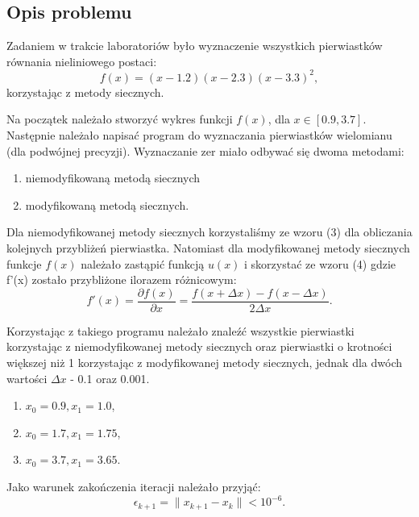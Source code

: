 \documentclass{article}
\begin{document}
\subsection{Opis problemu}
Zadaniem w trakcie laboratoriów było wyznaczenie wszystkich pierwiastków równania nieliniowego postaci:
\begin{equation}
	f(x) = (x - 1.2)(x - 2.3)(x - 3.3)^2 ,
\end{equation}
korzystając z metody siecznych. 
\par Na początek należało stworzyć wykres funkcji $f(x)$, dla $x \in [0.9, 3.7]$. Następnie należało napisać program do wyznaczania pierwiastków wielomianu (dla podwójnej precyzji). Wyznaczanie zer miało odbywać się dwoma metodami:
\begin{enumerate}
\begin{enumerate}
\item niemodyfikowaną metodą siecznych
\item modyfikowaną metodą siecznych.
\end{enumerate}
\end{enumerate}
Dla niemodyfikowanej metody siecznych korzystaliśmy ze wzoru (3) dla obliczania kolejnych przybliżeń pierwiastka.
Natomiast dla modyfikowanej metody siecznych funkcje $f(x)$ należało zastąpić funkcją $u(x)$ i skorzystać ze wzoru (4)
gdzie f'(x) zostało przybliżone ilorazem różnicowym:
\begin{equation}
f'(x) = \frac{\partial f(x)}{\partial x} = \frac{f(x+ \Delta x) - f(x- \Delta x)}{2 \Delta x}.
\end{equation}

\par Korzystając z takiego programu należało znaleźć wszystkie pierwiastki korzystając z niemodyfikowanej metody siecznych oraz pierwiastki o krotności większej niż 1 korzystając z modyfikowanej metody siecznych, jednak dla dwóch wartości $\Delta x$ - 0.1 oraz 0.001.
\begin{enumerate}
\begin{enumerate}
\item $x_0 = 0.9, x_1 = 1.0$,
\item $x_0 = 1.7, x_1 = 1.75$,
\item $x_0 = 3.7, x_1 = 3.65$.
\end{enumerate}
\end{enumerate}
Jako warunek zakończenia iteracji należało przyjąć:
\begin{equation}
\epsilon _{k+1} = \| x_{k+1} - x_k \| < 10 ^{-6}.
\end{equation}
\end{document}
